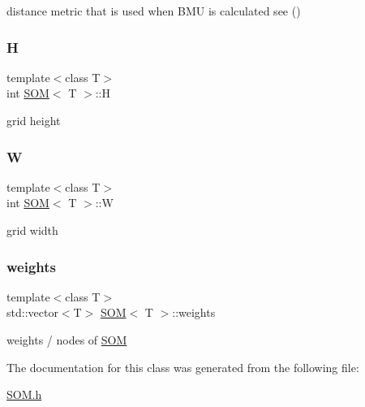 distance metric that is used when B\+MU is calculated see () 

\mbox{\label{class_s_o_m_a34ef6069c3f522ece1b0dad99484a9c3}} 
\subsubsection{\texorpdfstring{H}{H}}
{\footnotesize\ttfamily template$<$class T$>$ \\
int \mbox{\hyperlink{class_s_o_m}{S\+OM}}$<$ T $>$\+::H\hspace{0.3cm}{\ttfamily [private]}}



grid height 

\mbox{\label{class_s_o_m_a99414c651f0e1371d0e16437a1769fd9}} 
\subsubsection{\texorpdfstring{W}{W}}
{\footnotesize\ttfamily template$<$class T$>$ \\
int \mbox{\hyperlink{class_s_o_m}{S\+OM}}$<$ T $>$\+::W\hspace{0.3cm}{\ttfamily [private]}}



grid width 

\mbox{\label{class_s_o_m_abb0a6072eb9fd4c3bd297814e654f561}} 
\subsubsection{\texorpdfstring{weights}{weights}}
{\footnotesize\ttfamily template$<$class T$>$ \\
std\+::vector$<$T$>$ \mbox{\hyperlink{class_s_o_m}{S\+OM}}$<$ T $>$\+::weights\hspace{0.3cm}{\ttfamily [private]}}



weights / nodes of \mbox{\hyperlink{class_s_o_m}{S\+OM}} 



The documentation for this class was generated from the following file\+:\begin{DoxyCompactItemize}
\item 
\mbox{\hyperlink{_s_o_m_8h}{S\+O\+M.\+h}}\end{DoxyCompactItemize}

